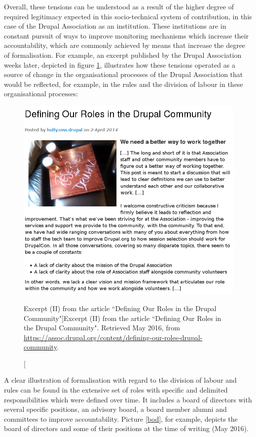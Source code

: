 Overall, these tensions can be understood as a result of the higher degree of required legitimacy expected in this socio-technical system of contribution, in this case of the Drupal Association as an institution. These institutions are in constant pursuit of ways to improve monitoring mechanisms which increase their accountability, which are commonly achieved by means that increase the degree of formalisation. For example, an excerpt published by the Drupal Association weeks later, depicted in figure \ref{quote_da_defining_roles_02}, illustrates how these tensions operated as a source of change in the organisational processes of the Drupal Association that would be reflected, for example, in the rules and the division of labour in these organisational processes:

\begin{figure}[H]
  \centering
\includegraphics[width=\textwidth]{img/quotes_replacement/holly_defining_roles_2014.png}
\caption[Excerpt (II) from the article ``Defining Our Roles in the Drupal Community"]{Excerpt (II) from the article ``Defining Our Roles in the Drupal Community". Retrieved  May 2016, from \url{https://assoc.drupal.org/content/defining-our-roles-drupal-community}.}
\label{quote_da_defining_roles_02}
\end{figure}

A clear illustration of formalisation with regard to the division of labour and rules can be found in the extensive set of roles with specific and delimited responsibilities which were defined over time. It includes a board of directors with several specific positions, an advisory board, a board member alumni and committees to improve accountability. Picture \ref{bod}, for example, depicts the board of directors and some of their positions at the time of writing (May 2016).



